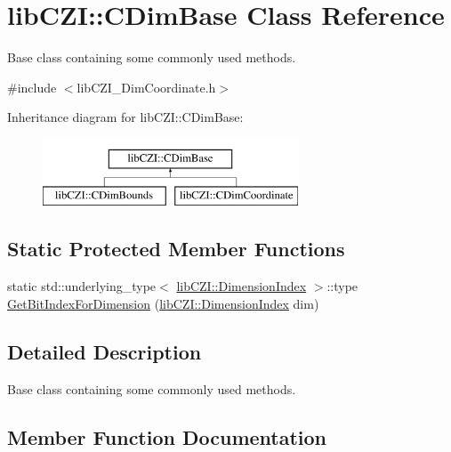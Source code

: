 \hypertarget{classlib_c_z_i_1_1_c_dim_base}{}\section{lib\+C\+ZI\+:\+:C\+Dim\+Base Class Reference}
\label{classlib_c_z_i_1_1_c_dim_base}


Base class containing some commonly used methods.  




{\ttfamily \#include $<$lib\+C\+Z\+I\+\_\+\+Dim\+Coordinate.\+h$>$}

Inheritance diagram for lib\+C\+ZI\+:\+:C\+Dim\+Base\+:\begin{figure}[H]
\begin{center}
\leavevmode
\includegraphics[height=2.000000cm]{classlib_c_z_i_1_1_c_dim_base}
\end{center}
\end{figure}
\subsection*{Static Protected Member Functions}
\begin{DoxyCompactItemize}
\item 
static std\+::underlying\+\_\+type$<$ \hyperlink{namespacelib_c_z_i_a55049658acf59d0eddfaebcad16df424}{lib\+C\+Z\+I\+::\+Dimension\+Index} $>$\+::type \hyperlink{classlib_c_z_i_1_1_c_dim_base_a952c7d14a037f1d6cf6d17ad15fac55a}{Get\+Bit\+Index\+For\+Dimension} (\hyperlink{namespacelib_c_z_i_a55049658acf59d0eddfaebcad16df424}{lib\+C\+Z\+I\+::\+Dimension\+Index} dim)
\end{DoxyCompactItemize}


\subsection{Detailed Description}
Base class containing some commonly used methods. 

\subsection{Member Function Documentation}
\mbox{\label{classlib_c_z_i_1_1_c_dim_base_a952c7d14a037f1d6cf6d17ad15fac55a}} 
